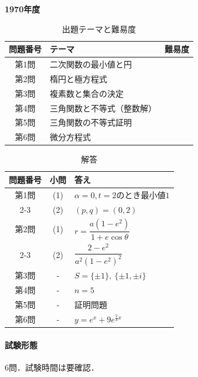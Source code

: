 \documentclass[../../main.tex]{subfiles}
\begin{document}
\begin{center}
  {\fontsize{48pt}{58pt}\selectfont \textbf{1970}\normalsize\textbf{年度}}
\end{center}

\begin{table}[htb]
  \centering
  \caption{出題テーマと難易度}
  \begin{tabular}{|c|p{9cm}|c|}
    \hline
    \textbf{問題番号} & \textbf{テーマ} & \textbf{難易度} \\
    \hline
    第1問 & 二次関数の最小値と円 & \\
    \hline
    第2問 & 楕円と極方程式 & \\
    \hline
    第3問 & 複素数と集合の決定 & \\
    \hline
    第4問 & 三角関数と不等式（整数解） & \\
    \hline
    第5問 & 三角関数の不等式証明 & \\
    \hline
    第6問 & 微分方程式 & \\
    \hline
  \end{tabular}
\end{table}

\begin{table}[htb]
  \centering
  \caption{解答}
  \renewcommand{\arraystretch}{1.4}
  \begin{tabular}{|c|c|p{9cm}|}
    \hline
    \textbf{問題番号} & \textbf{小問} & \textbf{答え} \\
    \hline
    第1問 & (1) & $\alpha=0,t=2$のとき最小値$1$ \\
    \cline{2-3}
    & (2) & $(p,q)=(0,2)$ \\
    \hline
    第2問 & (1) & $r=\dfrac{a(1-e^2)}{1+e\cos\theta}$ \\
    \cline{2-3}
    & (2) & $\dfrac{2-e^2}{a^2(1-e^2)^2}$ \\
    \hline
    第3問 & - & $S=\{\pm1\},\ \{\pm1,\pm i\}$ \\
    \hline
    第4問 & - & $n=5$ \\
    \hline
    第5問 & - & 証明問題 \\
    \hline
    第6問 & - & $y=e^x+9e^{\frac{2}{3}x}$ \\
    \hline
  \end{tabular}
\end{table}

\paragraph{試験形態}
6問．試験時間は要確認．
\end{document}
